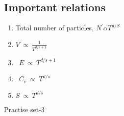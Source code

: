 \subsection{Important relations}
\begin{enumerate}
	\item Total number of particles, $N^{\prime} \alpha T^{d / S}$\\
	\item$V\  \propto\  \frac{1}{T^{d/s+1}}$ \\
	\item\  $E \ \propto \ T^{d / s+1}$\\
	\item\  $C_{v} \ \propto\  T^{d / s}$\\
	\item $S \ \propto\  T^{d / s}$	
\end{enumerate}
\newpage
\begin{abox}
	Practise set-3
\end{abox}
